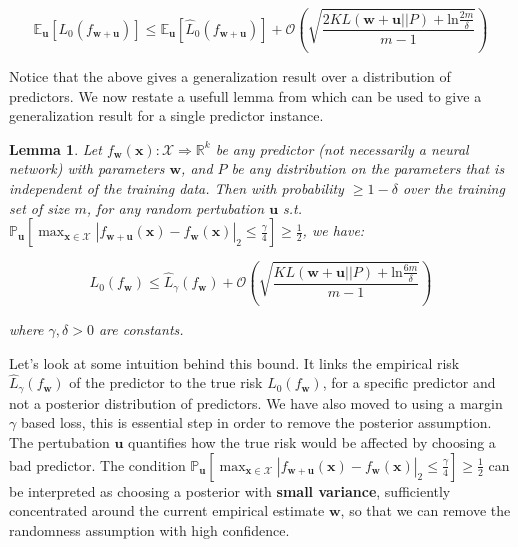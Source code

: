 \documentclass{article} %
\newtheorem{lemma}[theorem]{Lemma}
\theoremstyle{definition}
\begin{document}
\begin{equation}
\mathbb{E}_{\boldsymbol{u}} [ L_0(f_{\boldsymbol{w}+\boldsymbol{u}}) ] \leq \mathbb{E}_{\boldsymbol{u}}[\hat{L}_{0}(f_{\boldsymbol{w}+\boldsymbol{u}}) ] +\mathcal{O}(\sqrt{\frac{2KL(\boldsymbol{w}+\boldsymbol{u}||P) +\text{ln} \frac{2 m }{\delta} }{ m-1  }}) 
\end{equation}


Notice that the above gives a generalization result over a distribution of predictors. We now restate a usefull lemma from \citet{neyshabur2017pac} which can be used to give a generalization result for a single predictor instance.
\begin{lemma}
Let $f_{\boldsymbol{w}}(\boldsymbol{x}):\mathcal{X} \Rightarrow \mathbb{R}^k$ be any predictor (not necessarily a neural network) with parameters $\boldsymbol{w}$, and $P$ be any distribution on the parameters that is independent of the training data. Then with probability $\geq 1-\delta$ over the training set of size $m$, for any random pertubation $\boldsymbol{u}$ s.t. $\mathbb{P}_{\boldsymbol{u}}[\max_{\boldsymbol{x \in \mathcal{X}}} |f_{\boldsymbol{w}+\boldsymbol{u} }(\boldsymbol{x})-f_{\boldsymbol{w}}(\boldsymbol{x})|_2 \leq \frac{\gamma}{4} ] \geq \frac{1}{2}$, we have: 

\begin{equation}
L_0(f_{\boldsymbol{w}}) \leq \hat{L}_{\gamma}(f_{\boldsymbol{w}})+\mathcal{O}(\sqrt{\frac{KL(\boldsymbol{w}+\boldsymbol{u}||P) +\text{ln} \frac{6 m }{\delta} }{ m-1  }}) 
\end{equation}

where $\gamma,\delta > 0$ are constants.
\end{lemma}
Let's look at some intuition behind this bound. It links the empirical risk $\hat{L}_{\gamma}(f_{\boldsymbol{w}})$ of the predictor to the true risk $L_0(f_{\boldsymbol{w}})$, for a specific predictor and not a posterior distribution of predictors. We have also moved to using a margin $\gamma$ based loss, this is essential step in order to remove the posterior assumption. The pertubation $\boldsymbol{u}$ quantifies how the true risk would be affected by choosing a bad predictor. The condition $\mathbb{P}_{\boldsymbol{u}}[\max_{\boldsymbol{x \in \mathcal{X}}} |f_{\boldsymbol{w}+\boldsymbol{u} }(\boldsymbol{x})-f_{\boldsymbol{w}}(\boldsymbol{x})|_2 \leq \frac{\gamma}{4} ] \geq \frac{1}{2}$ can be interpreted as choosing a posterior with \textbf{small variance}, sufficiently concentrated around the current empirical estimate $\boldsymbol{w}$, so that we can remove the randomness assumption with high confidence.
\end{document}
